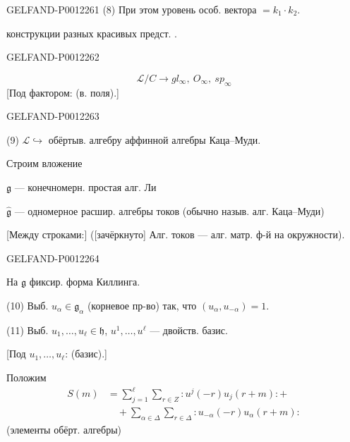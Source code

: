 \begin{GelfandAdjacentEvidence}{GELFAND-P001226}{1}
(8) При этом уровень особ. вектора \(=k_1\cdot k_2\).

 конструкции разных красивых предст. .
\end{GelfandAdjacentEvidence}
\begin{GelfandAdjacentEvidence}{GELFAND-P001226}{2}


\begin{equation*}
\mathcal L/C\longrightarrow gl_\infty,\ O_\infty,\ sp_\infty
\end{equation*}
[Под фактором: (в. поля).]
\end{GelfandAdjacentEvidence}
\begin{GelfandAdjacentEvidence}{GELFAND-P001226}{3}



(9) \(\mathcal L\hookrightarrow\) обёртыв. алгебру аффинной алгебры Каца--Муди.

Строим вложение

\(\mathfrak g\) --- конечномерн. простая алг. Ли

\(\widehat{\mathfrak g}\) --- одномерное расшир. алгебры токов (обычно назыв. алг. Каца--Муди)

[Между строками:] ([зачёркнуто]  Алг. токов --- алг. матр. ф-й на окружности).
\end{GelfandAdjacentEvidence}
\begin{GelfandAdjacentEvidence}{GELFAND-P001226}{4}


На \(\mathfrak g\) фиксир. форма Киллинга.

(10) Выб. \(u_\alpha\in\mathfrak g_\alpha\) (корневое пр-во) так, что
\((u_\alpha,u_{-\alpha})=1\).

(11) Выб. \(u_1,\ldots,u_\ell\in\mathfrak h\), \(u^1,\ldots,u^\ell\) --- двойств. базис.

[Под \(u_1,\ldots,u_\ell\): (базис).]

Положим
\begin{equation*}
\begin{aligned}
S(m)&=\sum_{j=1}^{\ell}\sum_{r\in Z}:u^j(-r)u_j(r+m):+\\
&\quad+\sum_{\alpha\in\Delta}\sum_{r\in\Delta}:u_{-\alpha}(-r)u_\alpha(r+m):
\end{aligned}\tag{12}
\end{equation*}
(элементы обёрт. алгебры)
\end{GelfandAdjacentEvidence}


